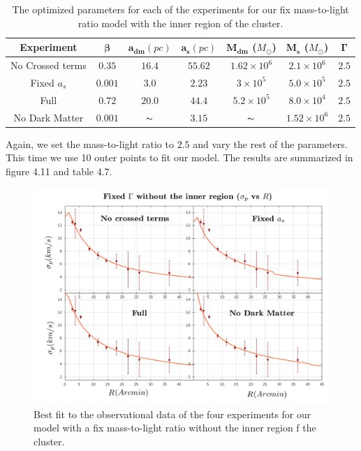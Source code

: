 \begin{table}[H]
\begin{center}
\begin{tabular}{| c| c| c| c| c| c| c|}
    \hline
    \textbf{Experiment} & $\mathbf{\beta}$ & $\mathbf{a_{dm}} (pc)$ & $\mathbf{a_{s}} (pc)$ & $\mathbf{M_{dm}}$ ($M_{\odot}$) & $\mathbf{M_{s}}$ ($M_{\odot}$) & $\mathbf{\Gamma}$\\ \hline
	No Crossed terms & $0.35$ &	$16.4$ &	$55.62$ &	$1.62 \times 10^{6}$ &	$2.1 \times 10^{6}$ &	$2.5$\\ \hline
	Fixed $a_s$ &	$0.001$ &	$3.0$ &	$2.23$ &	$3 \times 10^{5}$ &	$5.0 \times 10 ^{5}$ &	$2.5$\\ \hline
	Full &	$0.72$ &	$20.0$ &	$44.4$ &	$5.2 \times 10^{5}$ &	$8.0 \times 10^{4}$ &	$2.5$\\ \hline
	No Dark Matter &	$0.001$ &	$\thicksim$ & $ 3.15$ &	$\thicksim$ & $ 1.52 \times 10^{6}$ & 	$2.5$\\
    \hline
  \end{tabular} 
\caption[Optimized parameters for our fix mass-to-light ratio model with the inner region.]{The optimized parameters for each of the experiments for our fix mass-to-light ratio model with the inner region of the cluster.}
\end{center}
\end{table}

Again, we set the mass-to-light ratio to $2.5$ and vary the rest of the parameters. This time we use 10 outer points to fit our model. The results are summarized in figure 4.11 and table 4.7.

\begin{figure}[H]
\centering
\includegraphics[width=15cm]{images/fix_gamma_refinado_10.png}
\caption[Best fit of our model with a fix mass-to-light ratio without the inner region]{Best fit to the observational data of the four experiments for our model with a fix mass-to-light ratio without the inner region f the cluster.}
\end{figure}

